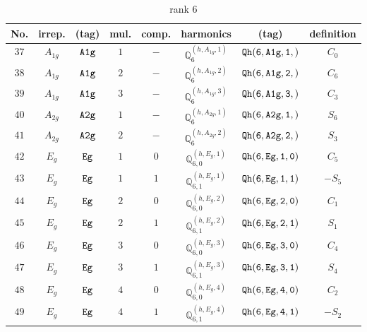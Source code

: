 \documentclass[fleqn,8pt]{jsarticle}
\begin{document}
\begin{table}[ht!]
\begin{center}
\caption{rank 6}
\renewcommand{\arraystretch}{1.3}
\begin{tabular}{cccccccc} \hline \hline
No. & irrep. & (tag) & mul. & comp. & harmonics & (tag) & definition \\ \hline
$ 37 $ & $ A_{1g} $ & $ {\tt A1g} $ & $ 1 $ & $ - $ & $ \mathbb{Q}_{6}^{(h,A_{1g},1)} $ & $ {\tt Qh(6,A1g,1,)} $ & $ C_{0} $ \\
$ 38 $ & $ A_{1g} $ & $ {\tt A1g} $ & $ 2 $ & $ - $ & $ \mathbb{Q}_{6}^{(h,A_{1g},2)} $ & $ {\tt Qh(6,A1g,2,)} $ & $ C_{6} $ \\
$ 39 $ & $ A_{1g} $ & $ {\tt A1g} $ & $ 3 $ & $ - $ & $ \mathbb{Q}_{6}^{(h,A_{1g},3)} $ & $ {\tt Qh(6,A1g,3,)} $ & $ C_{3} $ \\
$ 40 $ & $ A_{2g} $ & $ {\tt A2g} $ & $ 1 $ & $ - $ & $ \mathbb{Q}_{6}^{(h,A_{2g},1)} $ & $ {\tt Qh(6,A2g,1,)} $ & $ S_{6} $ \\
$ 41 $ & $ A_{2g} $ & $ {\tt A2g} $ & $ 2 $ & $ - $ & $ \mathbb{Q}_{6}^{(h,A_{2g},2)} $ & $ {\tt Qh(6,A2g,2,)} $ & $ S_{3} $ \\
$ 42 $ & $ E_{g} $ & $ {\tt Eg} $ & $ 1 $ & $ 0 $ & $ \mathbb{Q}_{6,0}^{(h,E_{g},1)} $ & $ {\tt Qh(6,Eg,1,0)} $ & $ C_{5} $ \\
$ 43 $ & $ E_{g} $ & $ {\tt Eg} $ & $ 1 $ & $ 1 $ & $ \mathbb{Q}_{6,1}^{(h,E_{g},1)} $ & $ {\tt Qh(6,Eg,1,1)} $ & $ - S_{5} $ \\
$ 44 $ & $ E_{g} $ & $ {\tt Eg} $ & $ 2 $ & $ 0 $ & $ \mathbb{Q}_{6,0}^{(h,E_{g},2)} $ & $ {\tt Qh(6,Eg,2,0)} $ & $ C_{1} $ \\
$ 45 $ & $ E_{g} $ & $ {\tt Eg} $ & $ 2 $ & $ 1 $ & $ \mathbb{Q}_{6,1}^{(h,E_{g},2)} $ & $ {\tt Qh(6,Eg,2,1)} $ & $ S_{1} $ \\
$ 46 $ & $ E_{g} $ & $ {\tt Eg} $ & $ 3 $ & $ 0 $ & $ \mathbb{Q}_{6,0}^{(h,E_{g},3)} $ & $ {\tt Qh(6,Eg,3,0)} $ & $ C_{4} $ \\
$ 47 $ & $ E_{g} $ & $ {\tt Eg} $ & $ 3 $ & $ 1 $ & $ \mathbb{Q}_{6,1}^{(h,E_{g},3)} $ & $ {\tt Qh(6,Eg,3,1)} $ & $ S_{4} $ \\
$ 48 $ & $ E_{g} $ & $ {\tt Eg} $ & $ 4 $ & $ 0 $ & $ \mathbb{Q}_{6,0}^{(h,E_{g},4)} $ & $ {\tt Qh(6,Eg,4,0)} $ & $ C_{2} $ \\
$ 49 $ & $ E_{g} $ & $ {\tt Eg} $ & $ 4 $ & $ 1 $ & $ \mathbb{Q}_{6,1}^{(h,E_{g},4)} $ & $ {\tt Qh(6,Eg,4,1)} $ & $ - S_{2} $ \\
 \hline \hline
\end{tabular}
\end{center}
\end{table}
\end{document}
